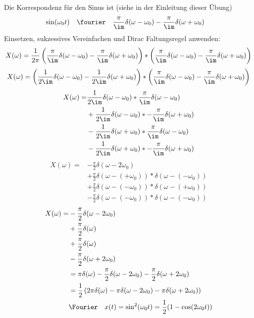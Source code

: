 \begin{ExCalc}
Die Korrespondenz für den Sinus ist (siehe  in der Einleitung dieser Übung)
\begin{align}
\sin(\omega_0 t) &\quad \fourier \quad \frac{\pi}{\im} \delta(\omega -\omega_0) - \frac{\pi}{\im} \delta(\omega + \omega_0)
\end{align}
Einsetzen, sukzessives Vereinfachen und Dirac Faltungsregel anwenden:
\begin{equation}
  X(\omega) = \frac{1}{2\pi}
  \left(\frac{\pi}{\im} \delta(\omega -\omega_0) - \frac{\pi}{\im} \delta(\omega + \omega_0)\right)
  \ast
  \left(\frac{\pi}{\im} \delta(\omega -\omega_0) - \frac{\pi}{\im} \delta(\omega + \omega_0)\right)
\end{equation}
\begin{equation}
  X(\omega) =
  \left(\frac{1}{2\im} \delta(\omega -\omega_0) - \frac{1}{2\im} \delta(\omega + \omega_0)\right)
  \ast
  \left(\frac{\pi}{\im} \delta(\omega -\omega_0) - \frac{\pi}{\im} \delta(\omega + \omega_0)\right)
\end{equation}
\begin{align}
  X(\omega) =
  &\frac{1}{2\im} \delta(\omega -\omega_0) \ast \frac{\pi}{\im} \delta(\omega -\omega_0)\\\nonumber
  &+ \frac{1}{2\im} \delta(\omega -\omega_0) \ast - \frac{\pi}{\im} \delta(\omega + \omega_0)\\\nonumber
  &- \frac{1}{2\im} \delta(\omega + \omega_0) \ast \frac{\pi}{\im} \delta(\omega -\omega_0)\\\nonumber
  &- \frac{1}{2\im} \delta(\omega + \omega_0) \ast - \frac{\pi}{\im} \delta(\omega + \omega_0)
\end{align}
\begin{align}
  X(\omega) =
  &-\frac{\pi}{2} \delta(\omega -2 \omega_0)\\\nonumber
  &+\frac{\pi}{2} \delta(\omega -(+\omega_0)) \ast \delta(\omega - (-\omega_0))\\\nonumber
  &+\frac{\pi}{2} \delta(\omega -(-\omega_0)) \ast \delta(\omega -(+\omega_0))\\\nonumber
  &-\frac{\pi}{2} \delta(\omega -(-\omega_0)) \ast \delta(\omega -(-\omega_0))
\end{align}
\begin{align}
  X(\omega) =
  &-\frac{\pi}{2} \delta(\omega -2 \omega_0)\\\nonumber
  &+\frac{\pi}{2} \delta(\omega)\\\nonumber
  &+\frac{\pi}{2} \delta(\omega)\\\nonumber
  &-\frac{\pi}{2} \delta(\omega +2 \omega_0)\\\nonumber
  & =\pi \delta(\omega) -\frac{\pi}{2} \delta(\omega -2 \omega_0) - \frac{\pi}{2} \delta(\omega +2 \omega_0)\\\nonumber
  & =\frac{1}{2} \left(2 \pi \delta(\omega) - \pi \delta(\omega -2 \omega_0) - \pi \delta(\omega +2 \omega_0)\right)\\\nonumber
  & \Fourier \quad x(t) = \sin^2(\omega_0 t) = \frac{1}{2} (1 - \cos(2\omega_0 t))
\end{align}

\end{ExCalc}
